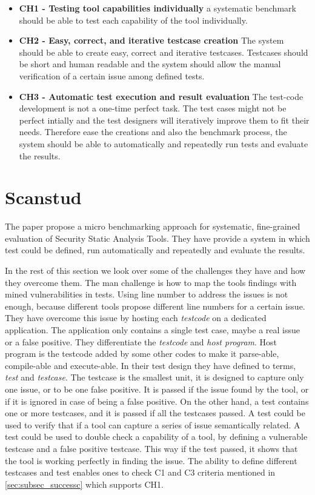 \documentclass[authoryear,preprint]{sigplanconf}
\begin{document}
\begin{itemize}
	\item \textbf{CH1 - Testing tool capabilities individually} a systematic benchmark should be able to test each capability of the tool individually. 
	\item \textbf{CH2 - Easy, correct, and iterative testcase creation} The system should be able to create easy, correct and iterative testcases. Testcases should be short and human readable and the system should allow the manual verification of a certain issue among defined tests. 
	\item \textbf{CH3 - Automatic test execution and result evaluation} The test-code development is not a one-time perfect task. The test cases might not be perfect intially and the test designers will iteratively improve them to fit their needs. Therefore ease the creations and also the benchmark process, the system should be able to automatically and repeatedly run tests and evaluate the results. 
\end{itemize}

\section{Scanstud}
\label{sec:sec_scanstud}
The paper propose a micro benchmarking approach for systematic, fine-grained evaluation of Security Static Analysis Tools. They have provide a system in which test could be defined, run automatically and repeatedly and evaluate the results. 

In the rest of this section we look over some of the challenges they have and how they overcome them. The man challenge is how to map the tools findings with mined vulnerabilities in tests. Using line number to address the issues is not enough, because different tools propose different line numbers for a certain issue. They have overcome this issue by hosting each \textit{testcode} on a dedicated application. The application only contains a single test case, maybe a real issue or a false positive. They differentiate the \textit{testcode} and \textit{host program}. Host program is the testcode added by some other codes to make it parse-able, compile-able and execute-able. In their test design they have defined to terms, \textit{test} and \textit{testcase}. The testcase is the smallest unit, it is designed to capture only one issue, or to be one false positive. It is passed if the issue found by the tool, or if it is ignored in case of being a false positive. On the other hand, a test contains one or more testcases, and it is passed if all the testcases passed. A test could be used to verify that if a tool can capture a series of issue semantically related. A test could be used to double check a capability of a tool, by defining a vulnerable testcase and a false positive testcase. This way if the test passed, it shows that the tool is working perfectly in finding the issue. The ability to define different testcases and test enables ones to check C1 and C3 criteria mentioned in \ref{sec:subsec_successc} which supports CH1.
\end{document}
